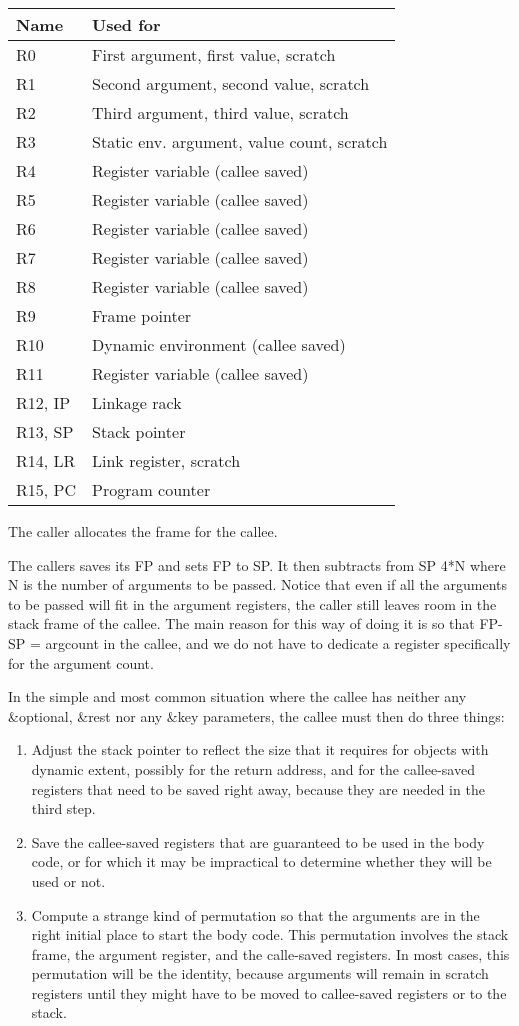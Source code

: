 \begin{tabular}{|l|l|}
\hline
Name & Used for\\
\hline
\hline
R0 & First argument, first value, scratch\\
R1 & Second argument, second value, scratch \\
R2 & Third argument, third value, scratch \\
R3 & Static env. argument, value count, scratch \\
R4 & Register variable (callee saved) \\
R5 & Register variable (callee saved) \\
R6 & Register variable (callee saved) \\
R7 & Register variable (callee saved) \\
R8 & Register variable (callee saved) \\
R9 & Frame pointer\\
R10 & Dynamic environment (callee saved) \\
R11 & Register variable (callee saved)\\
R12, IP & Linkage rack\\
R13, SP & Stack pointer \\
R14, LR & Link register, scratch \\
R15, PC & Program counter \\
\hline
\end{tabular}

The caller allocates the frame for the callee. 

The callers saves its FP and sets FP to SP.  It then subtracts from SP
4*N where N is the number of arguments to be passed.  Notice that even
if all the arguments to be passed will fit in the argument registers,
the caller still leaves room in the stack frame of the callee.  The
main reason for this way of doing it is so that FP-SP = argcount in
the callee, and we do not have to dedicate a register specifically for
the argument count.

In the simple and most common situation where the callee has neither
any \&optional, \&rest nor any \&key parameters, the callee must then
do three things:

\begin{enumerate}
\item Adjust the stack pointer to reflect the size that it requires
  for objects with dynamic extent, possibly for the return address,
  and for the callee-saved registers that need to be saved right
  away, because they are needed in the third step. 
\item Save the callee-saved registers that are guaranteed to be used
  in the body code, or for which it may be impractical to determine
  whether they will be used or not.  
\item Compute a strange kind of permutation so that the arguments are
  in the right initial place to start the body code.  This permutation
  involves the stack frame, the argument register, and the calle-saved
  registers.  In most cases, this permutation will be the identity,
  because arguments will remain in scratch registers until they might
  have to be moved to callee-saved registers or to the stack. 
\end{enumerate}

